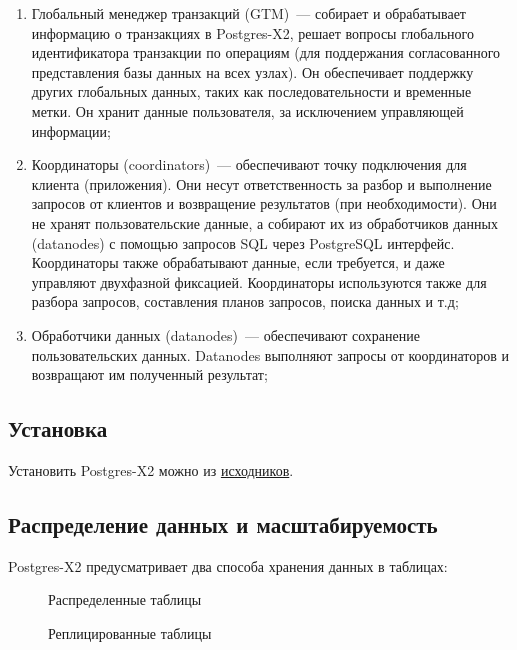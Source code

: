 \begin{enumerate}
  \item Глобальный менеджер транзакций (GTM)~--- собирает и обрабатывает информацию о транзакциях в Postgres-X2, решает вопросы глобального идентификатора транзакции по операциям (для поддержания согласованного представления базы данных на всех узлах). Он обеспечивает поддержку других глобальных данных, таких как последовательности и временные метки. Он хранит данные пользователя, за исключением управляющей информации;
  \item Координаторы (coordinators)~--- обеспечивают точку подключения для клиента (приложения). Они несут ответственность за разбор и выполнение запросов от клиентов и возвращение результатов (при необходимости). Они не хранят пользовательские данные, а собирают их из обработчиков данных (datanodes) с помощью запросов SQL через PostgreSQL интерфейс. Координаторы также обрабатывают данные, если требуется, и даже управляют двухфазной фиксацией. Координаторы используются также для разбора запросов, составления планов запросов, поиска данных и т.д;
  \item Обработчики данных (datanodes)~--- обеспечивают сохранение пользовательских данных. Datanodes выполняют запросы от координаторов и возвращают им полученный результат;
\end{enumerate}

\subsection{Установка}

Установить Postgres-X2 можно из \href{http://postgres-x2.github.io/}{исходников}.

\subsection{Распределение данных и масштабируемость}

Postgres-X2 предусматривает два способа хранения данных в таблицах:

\begin{figure}[ht!]
  \caption{Распределенные таблицы}
  \label{fig:postgres-x22}
\end{figure}

\begin{figure}[ht!]
  \caption{Реплицированные таблицы}
  \label{fig:postgres-x23}
\end{figure}

